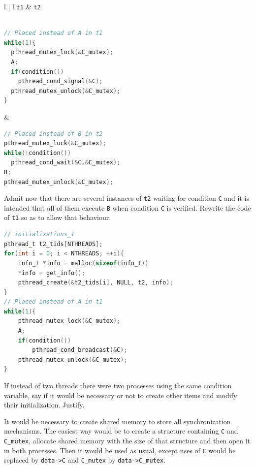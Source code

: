 \documentclass{sope}
\begin{document}
\begin{center}
    \lstset{
        numbers=none,
        showlines=true
    }
    \begin{tabular}{l | l}
        \texttt{t1} & \texttt{t2} \\ \hline \\
        \begin{minipage}{75mm}\begin{lstlisting}[language=C]
// Placed instead of A in t1
while(1){
  pthread_mutex_lock(&C_mutex);
  A;
  if(condition())
    pthread_cond_signal(&C);
  pthread_mutex_unlock(&C_mutex);
}
        \end{lstlisting}\end{minipage} &
        \begin{minipage}{75mm}\begin{lstlisting}[language=C]
// Placed instead of B in t2
pthread_mutex_lock(&C_mutex);
while(!condition())
  pthread_cond_wait(&C,&C_mutex);
B;
pthread_mutex_unlock(&C_mutex);


        \end{lstlisting}\end{minipage}
    \end{tabular}
\end{center}

Admit now that there are several instances of \texttt{t2} waiting for condition \texttt{C} and it is intended that all of them execute \texttt{B} when condition \texttt{C} is verified. Rewrite the code of \texttt{t1} so as to allow that behaviour.

\ansseparator

\begin{lstlisting}[language=C]
// initializations_1
pthread_t t2_tids[NTHREADS];
for(int i = 0; i < NTHREADS; ++i){
    info_t *info = malloc(sizeof(info_t))
    *info = get_info();
    pthread_create(&t2_tids[i], NULL, t2, info);
}
// Placed instead of A in t1
while(1){
    pthread_mutex_lock(&C_mutex);
    A;
    if(condition())
        pthread_cond_broadcast(&C);
    pthread_mutex_unlock(&C_mutex);
}
\end{lstlisting}

If instead of two threads there were two processes using the same condition variable, say if it would be necessary or not to create other items and modify their initialization. Justify.

\ansseparator

It would be necessary to create shared memory to store all synchronization mechanisms. The easiest way would be to create a structure containing \texttt{C} and \texttt{C\_mutex}, allocate shared memory with the size of that structure and then open it in both processes. Then it would be used as usual, except uses of \texttt{C} would be replaced by \texttt{data->C} and \texttt{C\_mutex} by \texttt{data->C\_mutex}.
\end{document}
